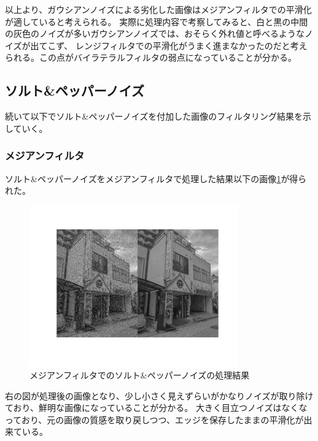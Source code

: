 \documentclass[a4paper,11pt,dvipdfmx]{jsarticle}
\begin{document}
以上より、ガウシアンノイズによる劣化した画像はメジアンフィルタでの平滑化が適していると考えられる。
実際に処理内容で考察してみると、白と黒の中間の灰色のノイズが多いガウシアンノイズでは、おそらく外れ値と呼べるようなノイズが出てこず、
レンジフィルタでの平滑化がうまく進まなかったのだと考えられる。この点がバイラテラルフィルタの弱点になっていることが分かる。

\subsection{ソルト\&ペッパーノイズ}
続いて以下でソルト\&ペッパーノイズを付加した画像のフィルタリング結果を示していく。

\subsubsection{メジアンフィルタ}
ソルト\&ペッパーノイズをメジアンフィルタで処理した結果以下の画像\ref{sp_med}が得られた。
\begin{figure}[h]
    \centering
    \includegraphics[width=90mm]{./img/sp_med.jpg}
    \caption{メジアンフィルタでのソルト\&ペッパーノイズの処理結果}
    \label{sp_med}
\end{figure}
右の図が処理後の画像となり、少し小さく見えずらいがかなりノイズが取り除けており、鮮明な画像になっていることが分かる。
大きく目立つノイズはなくなっており、元の画像の質感を取り戻しつつ、エッジを保存したままの平滑化が出来ている。
\end{document}
